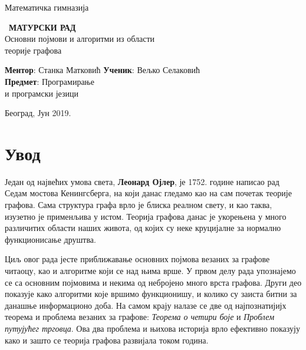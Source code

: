 \documentclass[11pt, oneside, a4paper]{article}
\begin{document}
\clearpage
{}

\begin{center}
    {\huge Математичка гимназија}
\end{center}
\vspace{0.35\textheight}
\begin{center}\
    {\huge \textbf{МАТУРСКИ РАД\\}}
    {\huge Основни појмови и алгоритми из области \\ теорије графова}
\end{center}
\vspace{0.30\textheight}
\begin{flushleft}
\textbf{Ментор}: Станка Матковић \hfill
\textbf{Ученик}: Вељко Селаковић \\ \textbf{Предмет}: Програмирање \\
и програмски језици
\end{flushleft}
\vspace{0.05\textheight}
\begin{center}
    Београд, Јун 2019.
\end{center}
\thispagestyle{empty}

\restoregeometry



\newpage

\tableofcontents
\newpage
\section{Увод}
Један од највећих умова света, \textbf{Леонард Ојлер}, је 1752. године написао рад \glqq Седам мостова Кенингсберга\grqq, на који данас гледамо као на сам почетак теорије графова. Сама структура графа врло је блиска реалном свету, и као таква, изузетно је применљива у истом. Теорија графова данас је укорењена у много различитих области наших живота, од којих су неке круцијалне за нормално функционисање друштва. \par
Циљ овог рада јесте приближавање основних појмова везаних за графове читаоцу, као и алгоритме који се над њима врше. У првом делу рада упознајемо се са основним појмовима и некима од небројено много врста графова. Други део показује како алгоритми које вршимо функционишу, и колико су заиста битни за данашње информационо доба. На самом крају налазе се две од најпознатијијх теорема и проблема везаних за графове: \textit{Теорема о четири боје} и \textit{Проблем путујућег трговца}. Ова два проблема и њихова историја врло ефективно показују како и зашто се теорија графова развијала током година.
\end{document}
